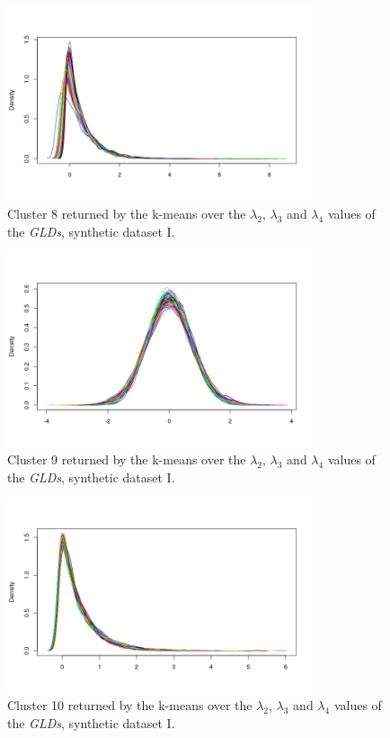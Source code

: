 \begin{figure}[H]
    \centering
    \includegraphics[width=0.8\textwidth]{img/gld_clustering/Dataset1/l2_l3_l4/intento_3/cluster8.png}
    \caption{Cluster 8 returned by the k-means over the $\lambda_{2}$, $\lambda_{3}$ and $\lambda_{4}$ values of the \textit{GLDs}, synthetic dataset I.}
    \label{fig:dataset1_l2l3l4_cl8}
\end{figure}

\begin{figure}[H]
    \centering
    \includegraphics[width=0.8\textwidth]{img/gld_clustering/Dataset1/l2_l3_l4/intento_3/cluster9.png}
    \caption{Cluster 9 returned by the k-means over the $\lambda_{2}$, $\lambda_{3}$ and $\lambda_{4}$ values of the \textit{GLDs}, synthetic dataset I.}
    \label{fig:dataset1_l2l3l4_cl9}
\end{figure}

\begin{figure}[H]
    \centering
    \includegraphics[width=0.8\textwidth]{img/gld_clustering/Dataset1/l2_l3_l4/intento_3/cluster10.png}
    \caption{Cluster 10 returned by the k-means over the $\lambda_{2}$, $\lambda_{3}$ and $\lambda_{4}$ values of the \textit{GLDs}, synthetic dataset I.}
    \label{fig:dataset1_l2l3l4_cl10}
\end{figure}

